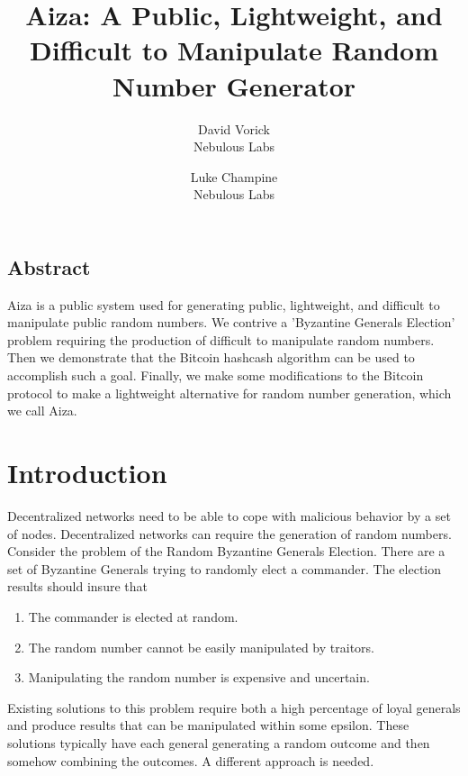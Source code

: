 \documentclass[twocolumn]{article}
\begin{document}
\frenchspacing

\title{Aiza: A Public, Lightweight, and Difficult to Manipulate Random Number Generator}

\author{
{\rm David Vorick}\\
Nebulous Labs
}
\author{
{\rm Luke Champine}\\
Nebulous Labs
}

\maketitle

\subsection*{Abstract}
Aiza is a public system used for generating public, lightweight, and difficult to manipulate public random numbers.
We contrive a 'Byzantine Generals Election' problem requiring the production of difficult to manipulate random numbers.
Then we demonstrate that the Bitcoin hashcash algorithm can be used to accomplish such a goal.
Finally, we make some modifications to the Bitcoin protocol to make a lightweight alternative for random number generation, which we call Aiza.


\section{Introduction}
Decentralized networks need to be able to cope with malicious behavior by a set of nodes.
Decentralized networks can require the generation of random numbers.
Consider the problem of the Random Byzantine Generals Election.
There are a set of Byzantine Generals trying to randomly elect a commander.
The election results should insure that
\begin{enumerate}
	\item The commander is elected at random.
	\item The random number cannot be easily manipulated by traitors.
	\item Manipulating the random number is expensive and uncertain.
\end{enumerate}

Existing solutions to this problem require both a high percentage of loyal generals and produce results that can be manipulated within some epsilon.
These solutions typically have each general generating a random outcome and then somehow combining the outcomes.
A different approach is needed.
\end{document}
